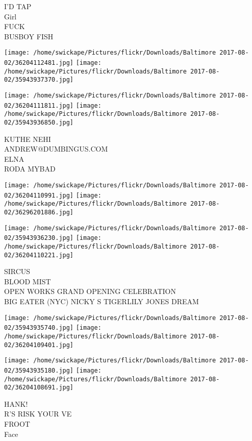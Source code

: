 \documentclass[10pt,letterpaper]{article}
\begin{document}
I'D TAP\\
Girl\\
FUCK\\
BUSBOY FISH\\
\pagebreak

\texttt{[image: /home/swickape/Pictures/flickr/Downloads/Baltimore 2017-08-02/36204112481.jpg]}
\texttt{[image: /home/swickape/Pictures/flickr/Downloads/Baltimore 2017-08-02/35943937370.jpg]}

\texttt{[image: /home/swickape/Pictures/flickr/Downloads/Baltimore 2017-08-02/36204111811.jpg]}
\texttt{[image: /home/swickape/Pictures/flickr/Downloads/Baltimore 2017-08-02/35943936850.jpg]}

KUTHE NEHI\\
ANDREW@DUMBINGUS.COM\\
ELNA\\
RODA MYBAD\\
\pagebreak

\texttt{[image: /home/swickape/Pictures/flickr/Downloads/Baltimore 2017-08-02/36204110991.jpg]}
\texttt{[image: /home/swickape/Pictures/flickr/Downloads/Baltimore 2017-08-02/36296201886.jpg]}

\texttt{[image: /home/swickape/Pictures/flickr/Downloads/Baltimore 2017-08-02/35943936230.jpg]}
\texttt{[image: /home/swickape/Pictures/flickr/Downloads/Baltimore 2017-08-02/36204110221.jpg]}

SIRCUS\\
BLOOD MIST\\
OPEN WORKS GRAND OPENING CELEBRATION\\
BIG EATER (NYC) NICKY S TIGERLILY JONES DREAM\\
\pagebreak

\texttt{[image: /home/swickape/Pictures/flickr/Downloads/Baltimore 2017-08-02/35943935740.jpg]}
\texttt{[image: /home/swickape/Pictures/flickr/Downloads/Baltimore 2017-08-02/36204109401.jpg]}

\texttt{[image: /home/swickape/Pictures/flickr/Downloads/Baltimore 2017-08-02/35943935180.jpg]}
\texttt{[image: /home/swickape/Pictures/flickr/Downloads/Baltimore 2017-08-02/36204108691.jpg]}

HANK!\\
R'S RISK YOUR VE\\
FROOT\\
Face\\
\pagebreak
\end{document}
